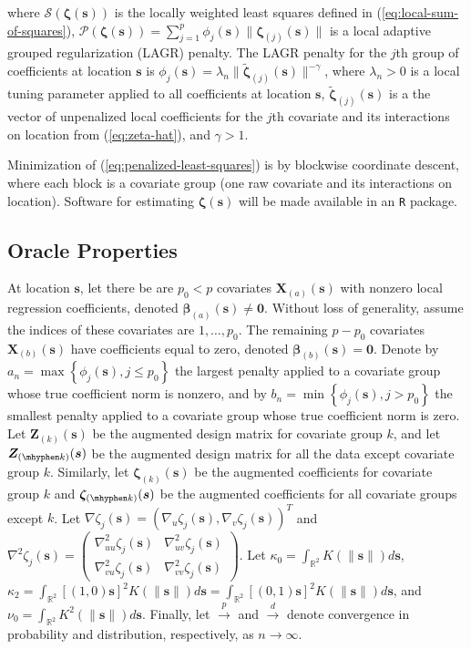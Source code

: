 \documentclass[authoryear,review, 12pt]{elsarticle}
\begin{document}
where $\mathcal{S}\left(\bm{\zeta}\left(\bm{s}\right)\right)$ is
the locally weighted least squares defined in (\ref{eq:local-sum-of-squares}),
$\mathcal{P}\left(\bm{\zeta}(\bm{s})\right)=\sum_{j=1}^{p}\phi_{j}(\bm{s})\|\bm{\zeta}_{(j)}(\bm{s})\|$
is a local adaptive grouped regularization (LAGR) penalty. The LAGR
penalty for the $j$th group of coefficients at location $\bm{s}$
is $\phi_{j}(\bm{s})=\lambda_{n}\|\tilde{\bm{\zeta}}_{(j)}(\bm{s})\|^{-\gamma}$,
where $\lambda_{n}>0$ is a local tuning parameter applied to all
coefficients at location $\bm{s}$, $\tilde{\bm{\zeta}}_{(j)}(\bm{s})$
is a the vector of unpenalized local coefficients for the $j$th covariate
and its interactions on location from (\ref{eq:zeta-hat}), and $\gamma>1$.

Minimization of (\ref{eq:penalized-least-squares}) is by blockwise
coordinate descent, where each block is a covariate group (one raw
covariate and its interactions on location). Software for estimating
$\bm{\zeta}(\bm{s})$ will be made available in an \texttt{R} package.

\subsection{Oracle Properties\label{sub:oracle-properties}}

At location $\bm{s}$, let there be are $p_{0}<p$ covariates $\bm{X}_{(a)}(\bm{s})$
with nonzero local regression coefficients, denoted $\bm{\beta}_{(a)}(\bm{s})\ne\bm{0}$.
Without loss of generality, assume the indices of these covariates
are $1,\dots,p_{0}$. The remaining $p-p_{0}$ covariates $\bm{X}_{(b)}(\bm{s})$
have coefficients equal to zero, denoted $\bm{\beta}_{(b)}(\bm{s})=\bm{0}$.
Denote by $a_{n}=\max\left\{ \phi_{j}(\bm{s}),j\le p_{0}\right\} $
the largest penalty applied to a covariate group whose true coefficient
norm is nonzero, and by $b_{n}=\min\left\{ \phi_{j}(\bm{s}),j>p_{0}\right\} $
the smallest penalty applied to a covariate group whose true coefficient
norm is zero. Let $\bm{Z}_{(k)}(\bm{s})$ be the augmented design
matrix for covariate group $k$, and let $\bm{Z}_{(\mhyphen k)}(\bm{s})$
be the augmented design matrix for all the data except covariate group
$k$. Similarly, let $\bm{\zeta}_{(k)}(\bm{s})$ be the augmented
coefficients for covariate group $k$ and $\bm{\zeta}_{(\mhyphen k)}(\bm{s})$
be the augmented coefficients for all covariate groups except $k$.
Let $\nabla\zeta_{j}(\bm{s})=\left(\nabla_{u}\zeta_{j}(\bm{s}),\nabla_{v}\zeta_{j}(\bm{s})\right)^{T}$
and $\nabla^{2}\zeta_{j}(\bm{s})=\left(\begin{array}{cc}
\nabla_{uu}^{2}\zeta_{j}(\bm{s}) & \nabla_{uv}^{2}\zeta_{j}(\bm{s})\\
\nabla_{vu}^{2}\zeta_{j}(\bm{s}) & \nabla_{vv}^{2}\zeta_{j}(\bm{s})
\end{array}\right)$. Let $\kappa_{0}=\int_{\mathbb{R}^{2}}K(\|\bm{s}\|)d\bm{s}$, $\kappa_{2}=\int_{\mathbb{R}^{2}}[(1,0)\bm{s}]^{2}K(\|\bm{s}\|)d\bm{s}=\int_{\mathbb{R}^{2}}[(0,1)\bm{s}]^{2}K(\|\bm{s}\|)d\bm{s}$,
and $\nu_{0}=\int_{\mathbb{R}^{2}}K^{2}(\|\bm{s}\|)d\bm{s}$. Finally,
let $\xrightarrow{p}$ and $\xrightarrow{d}$ denote convergence in
probability and distribution, respectively, as $n\to\infty$.
\end{document}
